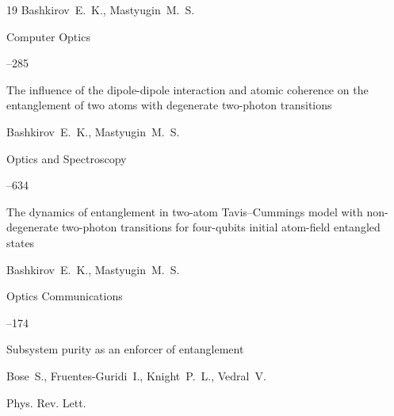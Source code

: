 \begin{thebibliography}{19}
\by Bashkirov~E.~K., Mastyugin~M.~S.


\jour Computer Optics



--285






\paper   The influence of the dipole-dipole interaction and atomic coherence on the entanglement of two atoms with degenerate two-photon transitions

\by Bashkirov~E.~K., Mastyugin~M.~S.


\jour Optics and Spectroscopy 



--634








\paper The dynamics of entanglement in two-atom Tavis--Cummings model with non-degenerate two-photon transitions for four-qubits initial atom-field entangled states

\by  Bashkirov~E.~K.,  Mastyugin~M.~S.

\jour Optics Communications



--174







\paper Subsystem purity as an  enforcer of entanglement

\by   Bose~S.,  Fruentes-Guridi~I.,  Knight~P.~L.,  Vedral~V.

\jour Phys. Rev. Lett.









\end{thebibliography}

